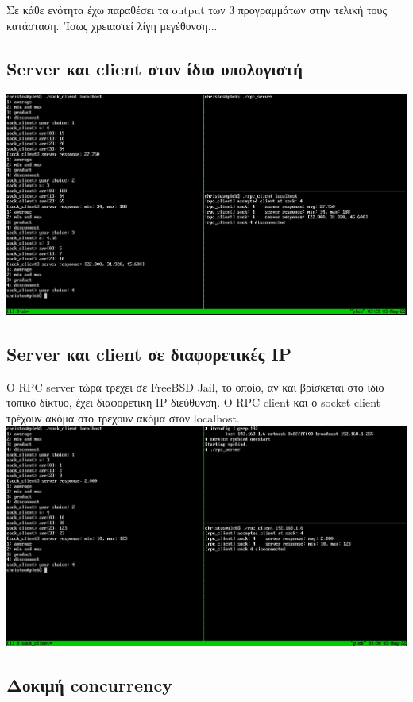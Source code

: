 \documentclass{article}
\begin{document}
Σε κάθε ενότητα έχω παραθέσει τα output των 3 προγραμμάτων στην τελική τους
κατάσταση. 'Ισως χρειαστεί λίγη μεγέθυνση...

\subsection{Server και client στον ίδιο υπολογιστή}

\includegraphics[width=\linewidth]{res/samepc.png}

\subsection{Server και client σε διαφορετικές IP}

Ο RPC server τώρα τρέχει σε FreeBSD Jail, το οποίο, αν και βρίσκεται στο ίδιο
τοπικό δίκτυο, έχει διαφορετική IP διεύθυνση. Ο RPC client και ο socket client
τρέχουν ακόμα στο τρέχουν ακόμα στον localhost. \\

\includegraphics[width=\linewidth]{res/jail.png}

\subsection{Δοκιμή concurrency}
\end{document}
